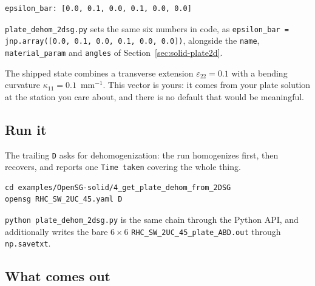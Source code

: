 \begin{lstlisting}[style=opensg,caption={The macro plate strain driving the recovery, in the yaml header.}]
epsilon_bar: [0.0, 0.1, 0.0, 0.1, 0.0, 0.0]
\end{lstlisting}

\texttt{plate\_dehom\_2dsg.py} sets the same six numbers in code, as
\texttt{epsilon\_bar = jnp.array([0.0, 0.1, 0.0, 0.1, 0.0, 0.0])}, alongside
the \texttt{name}, \texttt{material\_param} and \texttt{angles} of
Section~\ref{sec:solid-plate2d}.

The shipped state combines a transverse extension $\varepsilon_{22} = 0.1$ with
a bending curvature $\kappa_{11} = 0.1$~mm$^{-1}$. This vector is yours: it
comes from your plate solution at the station you care about, and there is no
default that would be meaningful.

\subsection{Run it}

The trailing \texttt{D} asks for dehomogenization: the run homogenizes first,
then recovers, and reports one \texttt{Time taken} covering the whole thing.

\begin{lstlisting}[style=shellst]
cd examples/OpenSG-solid/4_get_plate_dehom_from_2DSG
opensg RHC_SW_2UC_45.yaml D
\end{lstlisting}

\texttt{python plate\_dehom\_2dsg.py} is the same chain through the Python API,
and additionally writes the bare $6\times6$
\texttt{RHC\_SW\_2UC\_45\_plate\_ABD.out} through \texttt{np.savetxt}.

\subsection{What comes out}

